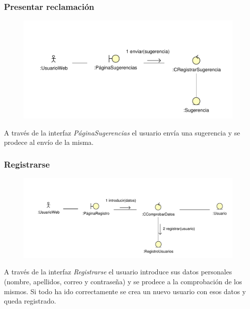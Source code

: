 \documentclass[11pt, a4paper, twoside, titlepage]{article}
\begin{document}
			\subsubsection{Presentar reclamación}
				\begin{figure}[H]\centering
					\includegraphics[scale=.82]{diagramas/presentarreclamacion.pdf}
				\end{figure}

					A través de la interfaz {\itshape PáginaSugerencias} el usuario envía una sugerencia y se prodece al envío de la misma.

			\subsubsection{Registrarse}
				\begin{figure}[H]\centering
					\includegraphics[scale=.8]{diagramas/registrarse.pdf}
				\end{figure}

					A través de la interfaz {\itshape Registrarse} el usuario introduce sus datos personales (nombre, apellidos, correo y contraseña) y se prodece a la comprobación de los mismos. Si todo ha ido correctamente se crea un nuevo usuario con esos datos y queda registrado.
\end{document}
